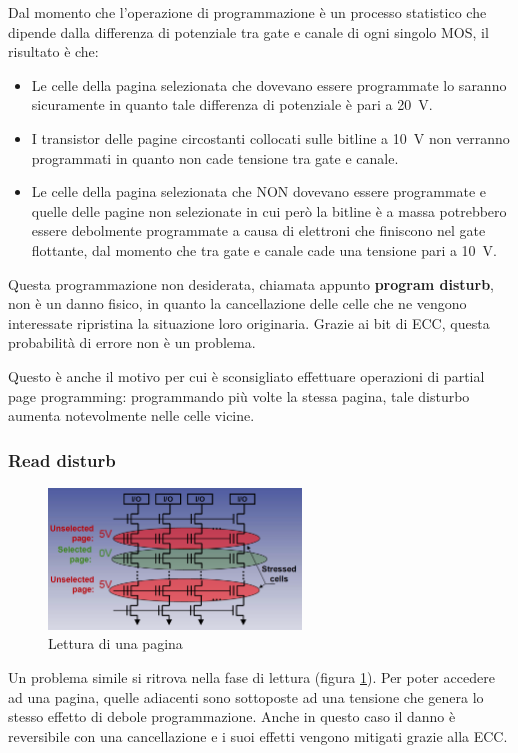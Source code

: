 \documentclass[11pt,4paper]{report}
\begin{document}
Dal momento che l'operazione di programmazione è un processo statistico che dipende dalla differenza di potenziale tra gate e canale di ogni singolo MOS, il risultato è che: 
\begin{itemize}
\item Le celle della pagina selezionata che dovevano essere programmate lo saranno sicuramente in quanto tale differenza di potenziale è pari a \SI{20}{\volt}.
\item I transistor delle pagine circostanti collocati sulle bitline a \SI{10}{\volt} non verranno programmati in quanto non cade tensione tra gate e canale.
\item Le celle della pagina selezionata che NON dovevano essere programmate e quelle delle pagine non selezionate in cui però la bitline è a massa potrebbero essere debolmente programmate a causa di elettroni che finiscono nel gate flottante, dal momento che tra gate e canale cade una tensione pari a \SI{10}{\volt}.
\end{itemize}
Questa programmazione non desiderata, chiamata appunto \textbf{program disturb}, non è un danno fisico, in quanto la cancellazione delle celle che ne vengono interessate ripristina la situazione loro originaria. Grazie ai bit di ECC, questa probabilità di errore non è un problema. 

Questo è anche il motivo per cui è sconsigliato effettuare operazioni di partial page programming: programmando più volte la stessa pagina, tale disturbo aumenta notevolmente nelle celle vicine. 

\subsubsection{Read disturb}
\begin{figure}[hbtp]
	\centering
	\includegraphics[width=0.6\textwidth]{memorie/jc_read_disturb}
	\caption{Lettura di una pagina}
	\label{fig:jc_read_disturb}
\end{figure}
Un problema simile si ritrova nella fase di lettura (figura \ref{fig:jc_read_disturb}). Per poter accedere ad una pagina, quelle adiacenti sono sottoposte ad una tensione che genera lo stesso effetto di debole programmazione. Anche in questo caso il danno è reversibile con una cancellazione e i suoi effetti vengono mitigati grazie alla ECC.
\end{document}
